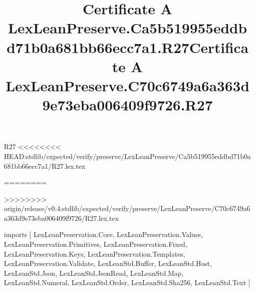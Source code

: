 \begin{lexlean}{R27}
<<<<<<<< HEAD:stdlib/expected/verify/preserve/LexLeanPreserve/Ca5b519955eddbd71b0a681bb66ecc7a1/R27.lex.tex
\title{Certificate A LexLeanPreserve.Ca5b519955eddbd71b0a681bb66ecc7a1.R27}
========
\title{Certificate A LexLeanPreserve.C70c6749a6a363d9e73eba006409f9726.R27}
>>>>>>>> origin/release/v0.4:stdlib/expected/verify/preserve/LexLeanPreserve/C70c6749a6a363d9e73eba006409f9726/R27.lex.tex
\begin{coremodule}
imports [
  LexLeanPreservation.Core,
  LexLeanPreservation.Values,
  LexLeanPreservation.Primitives,
  LexLeanPreservation.Fixed,
  LexLeanPreservation.Keys,
  LexLeanPreservation.Templates,
  LexLeanPreservation.Validate,
  LexLeanStd.Buffer,
  LexLeanStd.Host,
  LexLeanStd.Json,
  LexLeanStd.JsonRead,
  LexLeanStd.Map,
  LexLeanStd.Numeral,
  LexLeanStd.Order,
  LexLeanStd.Sha256,
  LexLeanStd.Text
]


\end{coremodule}
\end{lexlean}
